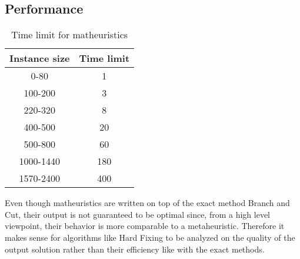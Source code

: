 \subsection{Performance}

\begin{table}[htbp]
	\centering
	\begin{tabular}{|c|c|}
        \hline \textbf{Instance size} & \textbf{Time limit} \\
		\hline 0-80 & 1 \\
		\hline 100-200 & 3 \\
        \hline 220-320 & 8 \\
        \hline 400-500 & 20 \\
        \hline 500-800 & 60 \\
        \hline 1000-1440 & 180 \\
        \hline 1570-2400 & 400 \\
        \hline
	\end{tabular}
    \vspace{2mm}    
	\caption{Time limit for matheuristics} \label{tab:mathheurTlim}
\end{table}

Even though matheuristics are written on top of the exact method Branch and Cut, their output is not guaranteed to be optimal since, from a high level viewpoint, their behavior is more comparable to a metaheuristic.
Therefore it makes sense for algorithms like Hard Fixing to be analyzed on the quality of the output solution rather than their efficiency like with the exact methods.

